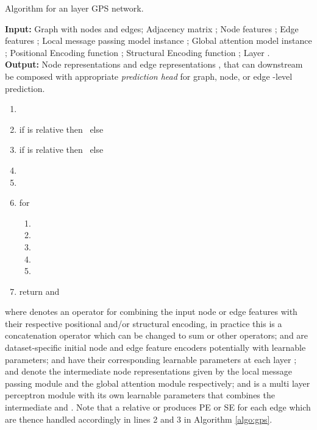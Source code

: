 \documentclass{article}
\begin{document}
\begin{algorithm}
\caption{Algorithm for an  layer GPS network.}


\textbf{Input:} Graph  with  nodes and  edges; 
Adjacency matrix ; 
Node features ; 
Edge features ;
Local message passing model instance ;
Global attention model instance ; 
Positional Encoding function ;
Structural Encoding function ;
Layer .\\ 
\textbf{Output:} Node representations  and edge representations , that can downstream be composed with appropriate \emph{prediction head} for graph, node, or edge -level prediction.
\begin{enumerate}
    \item 
    \item if  is relative then  \ else \ 
    \item if  is relative then  \ else \ 
    \item  
    \item  
    \item for 
    \begin{enumerate}
        \item 
        \item 
        \item 
        \item 
        \item 
    \end{enumerate}
    \item return  and 
\end{enumerate}
\label{algo:gps}
\end{algorithm}
where  denotes an operator for combining the input node or edge features with their respective positional and/or structural encoding, in practice this is a concatenation operator which can be changed to sum or other operators;  and  are dataset-specific initial node and edge feature encoders potentially with learnable parameters;  and  have their corresponding learnable parameters at each layer ;  and  denote the intermediate node representations given by the local message passing module and the global attention module respectively; and  is a multi layer perceptron module with its own learnable parameters that combines the intermediate  and . Note that a relative  or  produces PE or SE for each edge which are thence handled accordingly in lines 2 and 3 in Algorithm \ref{algo:gps}.
\end{document}
